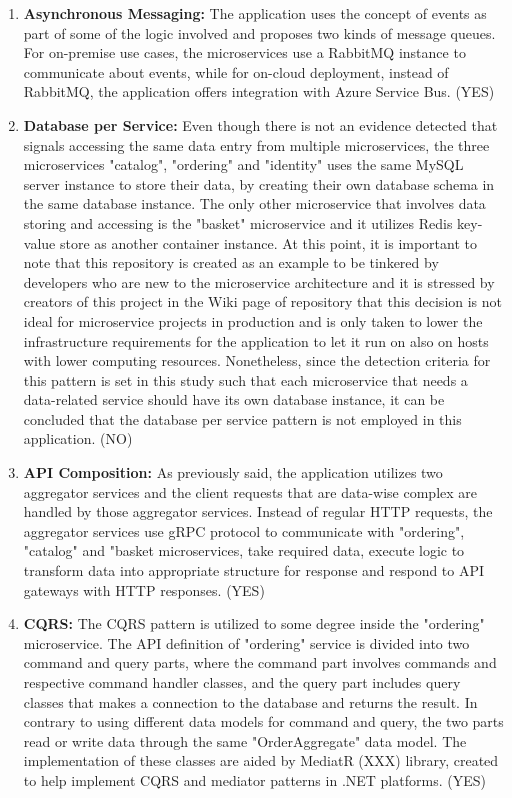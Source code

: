 \documentclass{Configuration_Files/PoliMi3i_thesis}
\begin{document}
\begin{enumerate}
    \item \textbf{Asynchronous Messaging:} The application uses the concept of events as part of some of the logic involved and proposes two kinds of message queues.
    For on-premise use cases, the microservices use a RabbitMQ instance to communicate about events, while for on-cloud deployment, instead of RabbitMQ, the application offers integration with Azure Service Bus. (YES)
    
    \item \textbf{Database per Service:} Even though there is not an evidence detected that signals accessing the same data entry from multiple microservices, the three microservices "catalog", "ordering" and "identity" uses the same MySQL server instance to store their data, by creating their own database schema in the same database instance.
    The only other microservice that involves data storing and accessing is the "basket" microservice and it utilizes Redis key-value store as another container instance.
    At this point, it is important to note that this repository is created as an example to be tinkered by developers who are new to the microservice architecture and it is stressed by creators of this project in the Wiki page of repository that this decision is not ideal for microservice projects in production and is only taken to lower the infrastructure requirements for the application to let it run on also on hosts with lower computing resources.
    Nonetheless, since the detection criteria for this pattern is set in this study such that each microservice that needs a data-related service should have its own database instance, it can be concluded that the database per service pattern is not employed in this application. (NO)
    
    \item \textbf{API Composition:} As previously said, the application utilizes two aggregator services and the client requests that are data-wise complex are handled by those aggregator services.
    Instead of regular HTTP requests, the aggregator services use gRPC protocol to communicate with "ordering", "catalog" and "basket microservices, take required data, execute logic to transform data into appropriate structure for response and respond to API gateways with HTTP responses. (YES)
    
    \item \textbf{CQRS:} The CQRS pattern is utilized to some degree inside the "ordering" microservice.
    The API definition of "ordering" service is divided into two command and query parts, where the command part involves commands and respective command handler classes, and the query part includes query classes that makes a connection to the database and returns the result.
    In contrary to using different data models for command and query, the two parts read or write data through the same "OrderAggregate" data model.
    The implementation of these classes are aided by MediatR (XXX) library, created to help implement CQRS and mediator patterns in .NET platforms. (YES)
    

\end{enumerate}
\end{document}
